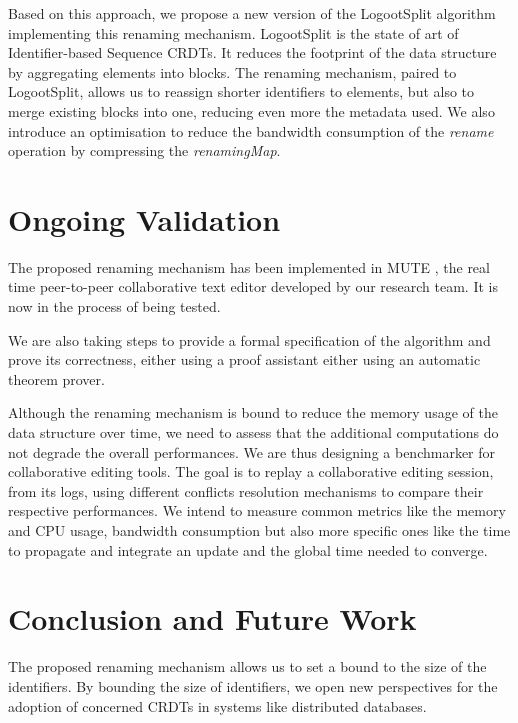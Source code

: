 \documentclass[sigplan]{acmart}
\begin{document}
Based on this approach, we propose a new version of the LogootSplit \cite{AndreCollaborateCom2013} algorithm implementing this renaming mechanism.
LogootSplit is the state of art of Identifier-based Sequence \acp{CRDT}.
It reduces the footprint of the data structure by aggregating elements into blocks.
The renaming mechanism, paired to LogootSplit, allows us to reassign shorter identifiers to elements, but also to merge existing blocks into one, reducing even more the metadata used.
We also introduce an optimisation to reduce the bandwidth consumption of the \emph{rename} operation by compressing the \emph{renamingMap}.

\section{Ongoing Validation}

The proposed renaming mechanism has been implemented in MUTE \cite{nicolas:hal-01655438}, the real time peer-to-peer collaborative text editor developed by our research team.
It is now in the process of being tested.

We are also taking steps to provide a formal specification of the algorithm and prove its correctness, either using a proof assistant either using an automatic theorem prover.

Although the renaming mechanism is bound to reduce the memory usage of the data structure over time, we need to assess that the additional computations do not degrade the overall performances.
We are thus designing a benchmarker for collaborative editing tools.
The goal is to replay a collaborative editing session, from its logs, using different conflicts resolution mechanisms to compare their respective performances.
We intend to measure common metrics like the memory and CPU usage, bandwidth consumption but also more specific ones like the time to propagate and integrate an update and the global time needed to converge.

\section{Conclusion and Future Work}

The proposed renaming mechanism allows us to set a bound to the size of the identifiers.
By bounding the size of identifiers, we open new perspectives for the adoption of concerned \acp{CRDT} in systems like distributed databases.
\end{document}
